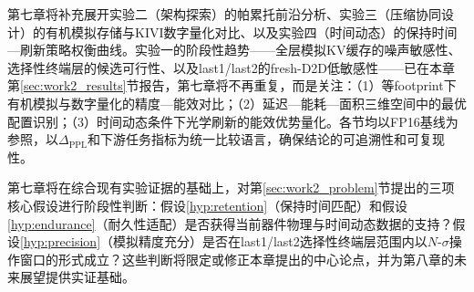 第七章将补充展开实验二（架构探索）的帕累托前沿分析、实验三（压缩协同设计）的有机模拟存储与KIVI数字量化对比、以及实验四（时间动态）的保持时间—刷新策略权衡曲线。实验一的阶段性趋势——全层模拟KV缓存的噪声敏感性、选择性终端层的候选可行性、以及last1/last2的fresh-D2D低敏感性——已在本章第\ref{sec:work2_results}节报告，第七章将不再重复，而是关注：（1）等footprint下有机模拟与数字量化的精度—能效对比；（2）延迟—能耗—面积三维空间中的最优配置识别；（3）时间动态条件下光学刷新的能效优势量化。各节均以FP16基线为参照，以$\Delta_{\text{PPL}}$和下游任务指标为统一比较语言，确保结论的可追溯性和可复现性。

第七章将在综合现有实验证据的基础上，对第\ref{sec:work2_problem}节提出的三项核心假设进行阶段性判断：假设\ref{hyp:retention}（保持时间匹配）和假设\ref{hyp:endurance}（耐久性适配）是否获得当前器件物理与时间动态数据的支持？假设\ref{hyp:precision}（模拟精度充分）是否在last1/last2选择性终端层范围内以$N$-$\sigma$操作窗口的形式成立？这些判断将限定或修正本章提出的中心论点，并为第八章的未来展望提供实证基础。
